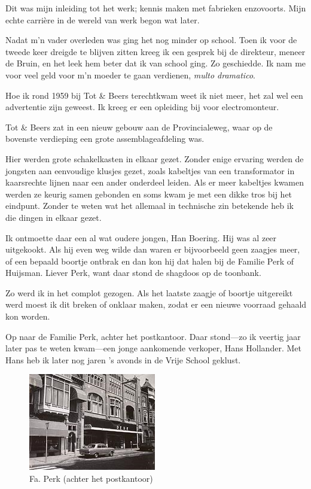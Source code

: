 \documentclass[12pt,twoside, openright]{memoir}
\begin{document}
Dit was mijn inleiding tot het werk; kennis maken met fabrieken enzovoorts. Mijn echte carrière in de wereld van werk begon wat later.

Nadat m’n vader overleden was ging het nog minder op school. Toen ik voor de tweede keer dreigde te blijven zitten kreeg ik een gesprek bij de direkteur, meneer de Bruin, en het leek hem beter dat ik van school ging. Zo geschiedde. Ik nam me voor veel geld voor m’n moeder te gaan verdienen, \emph{multo dramatico}.

Hoe ik rond 1959 bij Tot \& Beers terechtkwam weet ik niet meer, het zal wel een advertentie zijn geweest. Ik kreeg er een opleiding bij voor electromonteur.

Tot \& Beers zat in een nieuw gebouw aan de Provincialeweg, waar op de bovenste verdieping een grote assemblageafdeling was. 

Hier werden grote schakelkasten in elkaar gezet. Zonder enige ervaring werden de jongsten aan eenvoudige klusjes gezet, zoals kabeltjes van een transformator in kaarsrechte lijnen naar een ander onderdeel leiden. Als er meer kabeltjes kwamen werden ze keurig samen gebonden en soms kwam je met een dikke tros bij het eindpunt. Zonder te weten wat het allemaal in technische zin betekende heb ik die dingen in elkaar gezet. 

Ik ontmoette daar een al wat oudere jongen, Han Boering. Hij was al zeer uitgekookt. Als hij even weg wilde dan waren er bijvoorbeeld geen zaagjes meer, of een bepaald boortje ontbrak en dan kon hij dat halen bij de Familie Perk of Huijsman. Liever Perk, want daar stond de shagdoos op de toonbank. 

Zo werd ik in het complot gezogen. Als het laatste zaagje of boortje uitgereikt werd moest ik dit breken of onklaar maken, zodat er een nieuwe voorraad gehaald kon worden. 

Op naar de Familie Perk, achter het postkantoor. Daar stond---zo ik veertig jaar later pas te weten kwam---een jonge aankomende verkoper, Hans Hollander. Met Hans heb ik later nog jaren ’s avonds in de Vrije School geklust. 

\begin{figure}
\includegraphics[width=\textwidth]{img/ch32/image-2}
\caption*{\footnotesize Fa. Perk (achter het postkantoor)}
\end{figure}
\end{document}
